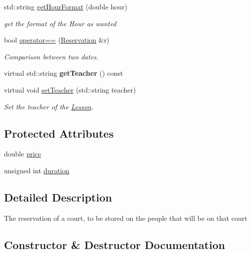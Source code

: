 \begin{DoxyCompactItemize}
std\+::string \mbox{\hyperlink{class_reservation_a36aa0b30371103b07aa331b33e6109d1}{get\+Hour\+Format}} (double hour)
\begin{DoxyCompactList}\small\item\em get the format of the Hour as wanted \end{DoxyCompactList}\item 
bool \mbox{\hyperlink{class_reservation_a228b1145e4b553c2f98d958a84de5ac1}{operator==}} (\mbox{\hyperlink{class_reservation}{Reservation}} \&r)
\begin{DoxyCompactList}\small\item\em Comparison between two dates. \end{DoxyCompactList}\item 
\mbox{\label{class_reservation_a70e2ac8be972694f0a5fcf87d26e7e78}} 
virtual std\+::string {\bfseries get\+Teacher} () const
\item 
virtual void \mbox{\hyperlink{class_reservation_afa8eadd14292a52c6a404078690a7f87}{set\+Teacher}} (std\+::string teacher)
\begin{DoxyCompactList}\small\item\em Set the teacher of the \mbox{\hyperlink{class_lesson}{Lesson}}. \end{DoxyCompactList}\end{DoxyCompactItemize}
\subsection*{Protected Attributes}
\begin{DoxyCompactItemize}
\item 
double \mbox{\hyperlink{class_reservation_a82e197bd30e7949ee9b8616ee4eacf83}{price}}
\item 
unsigned int \mbox{\hyperlink{class_reservation_a1a311bb23edebfa226f9c744aefdc7b1}{duration}}
\end{DoxyCompactItemize}


\subsection{Detailed Description}
The reservation of a court, to be stored on the people that will be on that court 

\subsection{Constructor \& Destructor Documentation}
\mbox{\label{class_reservation_a917852588c2eca452e19b59a18fb372c}} 
